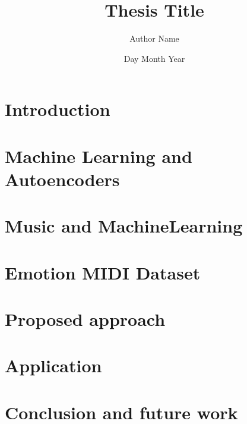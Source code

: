 \documentclass[12pt,twoside]{report}
\title{Thesis Title}
\author{Author Name}
\date{Day Month Year}
\begin{document}







\tableofcontents

\listoffigures

\listoftables



\chapter{Introduction}


\chapter{Machine Learning and Autoencoders}


\chapter{Music and MachineLearning}


\chapter{Emotion MIDI Dataset}


\chapter{Proposed approach}


\chapter{Application}


\chapter{Conclusion and future work}


% 

% 



\end{document}
